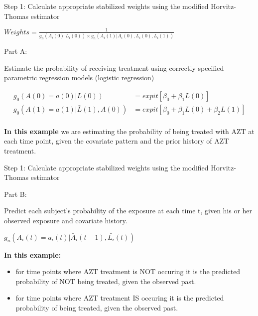 \documentclass[ignorenonframetext,]{beamer}
\providecommand{\tightlist}{%
  \setlength{\itemsep}{0pt}\setlength{\parskip}{0pt}}
\begin{document}
\begin{frame}{Step 1: Calculate appropriate stabilized weights using the
modified Horvitz-Thomas estimator}

\(Weights = \frac{1}{g_n(A_i(0) | L_i(0))\times g_n(A_i(1) | A_i(0), L_i(0), L_i(1))}\)

\vspace{6 mm}

\begin{block}{Part A:}

Estimate the probability of receiving treatment using correctly
specified parametric regression models (logistic regression)

\begin{align*}
g_0(A(0)=a(0)|L(0)) &= expit[\beta_0 + \beta_1 L(0)] \\
g_0(A(1)=a(1)|\bar{L}(1), A(0)) &= expit[\beta_0 + \beta_1 L(0) + \beta_2 L(1)] \\
\end{align*}

\textbf{In this example} we are estimating the probability of being
treated with AZT at each time point, given the covariate pattern and the
prior history of AZT treatment.

\end{block}

\end{frame}

\begin{frame}{Step 1: Calculate appropriate stabilized weights using the
modified Horvitz-Thomas estimator}

\begin{block}{Part B:}

Predict each subject's probability of the exposure at each time t, given
his or her observed exposure and covariate history.

\vspace{6 mm}

\(g_n(A_i(t)=a_i(t) | \bar{A}_i(t-1), \bar{L_i}(t))\)

\vspace{6mm}

\textbf{In this example:}

\begin{itemize}
\tightlist
\item
  for time points where AZT treatment is NOT occuring it is the
  predicted probability of NOT being treated, given the observed past.
\item
  for time points where AZT treatment IS occuring it is the predicted
  probability of being treated, given the observed past.
\end{itemize}

\end{block}

\end{frame}
\end{document}
